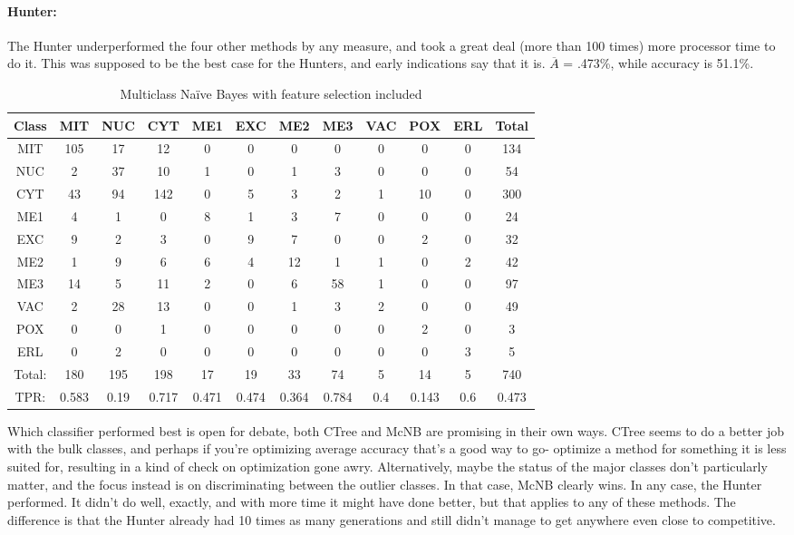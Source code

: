 \begin{table}[h!]
	\paragraph{Hunter:}
The Hunter underperformed the four other methods by any measure, and took a great deal (more than 100 times) more processor time to do it.  This was supposed to be the best case for the Hunters, and early indications say that it is.  $\overline{A}$ = .473\%, while accuracy is 51.1\%.  
\\
	\begin{tabular}{|c|c|c|c|c|c|c|c|c|c|c|c|}
		\hline
		Class&MIT&NUC&CYT&ME1&EXC&ME2&ME3&VAC&POX&ERL&Total\\
		\hline
MIT&105&17&12&0&0&0&0&0&0&0&134\\
NUC&2&37&10&1&0&1&3&0&0&0&54\\
CYT&43&94&142&0&5&3&2&1&10&0&300\\
ME1&4&1&0&8&1&3&7&0&0&0&24\\
EXC&9&2&3&0&9&7&0&0&2&0&32\\
ME2&1&9&6&6&4&12&1&1&0&2&42\\
ME3&14&5&11&2&0&6&58&1&0&0&97\\
VAC&2&28&13&0&0&1&3&2&0&0&49\\
POX&0&0&1&0&0&0&0&0&2&0&3\\
ERL&0&2&0&0&0&0&0&0&0&3&5\\
\hline
Total:&180&195&198&17&19&33&74&5&14&5&740\\
TPR:&0.583&0.19&0.717&0.471&0.474&0.364&0.784&0.4&0.143&0.6&0.473\\

		\hline
	\end{tabular}
	\caption[Yeast: Multiclass Na\"ive Bayes with Feature Selection Confusion Matrix]{Multiclass Na\"ive Bayes with feature selection included}
	\label{tab:yeasthunter}
\end{table}

Which classifier performed best is open for debate, both CTree and McNB are promising in their own ways.  CTree seems to do a better job with the bulk classes, and perhaps if you're optimizing average accuracy that's a good way to go- optimize a method for something it is less suited for, resulting in a kind of check on optimization gone awry.  Alternatively, maybe the status of the major classes don't particularly matter, and the focus instead is on discriminating between the outlier classes.  In that case, McNB clearly wins.  In any case, the Hunter performed.  It didn't do well, exactly, and with more time it might have done better, but that applies to any of these methods.  The difference is that the Hunter already had 10 times as many generations and still didn't manage to get anywhere even close to competitive.

